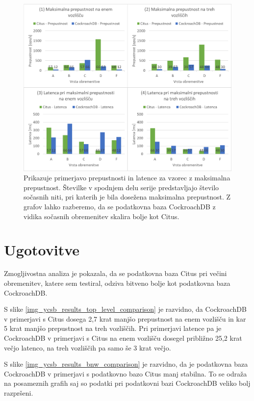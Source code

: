 \documentclass[a4paper, 12pt]{book}
\begin{document}
\begin{figure}[H]
\begin{center}
\includegraphics[width=1.0\textwidth]{resources/maxThroughput.png}
\end{center}
\caption{Prikazuje primerjavo prepustnosti in latence za vzorec z maksimalna prepustnost. Številke v spodnjem delu serije predstavljajo število sočasnih niti, pri katerih je bila dosežena maksimalna prepustnost. Z grafov lahko razberemo, da se podatkovna baza CockroachDB z vidika sočasnih obremenitev skalira bolje kot Citus.}
\label{img_ycsb_results_max_throughput}
\end{figure}

\newpage

\section{Ugotovitve}
Zmogljivostna analiza je pokazala, da se podatkovna baza Citus pri večini obremenitev, katere sem testiral, odziva bitveno bolje kot podatkovna baza CockroachDB.

S slike \ref{img_ycsb_results_top_level_comparison} je razvidno, da CockroachDB v primerjavi s Citus dosega 2,7 krat manjšo prepustnost na enem vozlišču in kar 5 krat manjšo prepustnost na treh vozliščih. Pri primerjavi latence pa je CockroachDB v primerjavi s Citus na enem vozlišču dosegel približno 25,2 krat večjo latenco, na treh vozliščih pa samo še 3 krat večjo.

S slike \ref{img_ycsb_results_bnw_comparison} je razvidno, da je podatkovna baza CockroachDB v primerjavi s podatkovno bazo Citus manj stabilna. To se odraža na posameznih grafih saj so podatki pri podatkovni bazi CockroachDB veliko bolj razpršeni.
\end{document}
